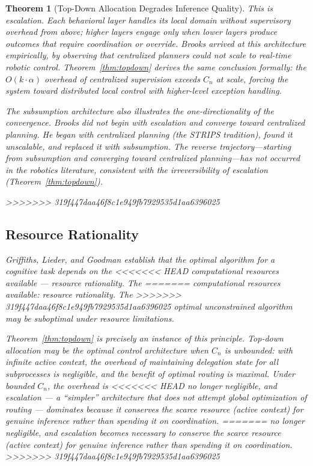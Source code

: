 \documentclass[11pt]{article}
\newtheorem{theorem}{Theorem}
\theoremstyle{definition}
\begin{document}
\begin{theorem}[Top-Down Allocation Degrades Inference Quality]
This is escalation. Each behavioral layer handles its local domain
without supervisory overhead from above; higher layers engage only when
lower layers produce outcomes that require coordination or override.
Brooks arrived at this architecture empirically, by observing that
centralized planners could not scale to real-time robotic control.
Theorem~\ref{thm:topdown} derives the same conclusion formally: the
$O(k \cdot \alpha)$ overhead of centralized supervision exceeds $C_n$
at scale, forcing the system toward distributed local control with
higher-level exception handling.

The subsumption architecture also illustrates the one-directionality
of the convergence. Brooks did not begin with escalation and converge
toward centralized planning. He began with centralized planning
(the STRIPS tradition), found it unscalable, and replaced it with
subsumption. The reverse trajectory---starting from subsumption and
converging toward centralized planning---has not occurred in the
robotics literature, consistent with the irreversibility of escalation
(Theorem~\ref{thm:topdown}).

>>>>>>> 319f447daa46f8c1e949fb7929535d1aa6396025
\subsection{Resource Rationality}

Griffiths, Lieder, and Goodman \cite{GriffithsEtAl2015} establish
that the optimal algorithm for a cognitive task depends on the
<<<<<<< HEAD
computational resources available --- resource rationality. The
=======
computational resources available: resource rationality. The
>>>>>>> 319f447daa46f8c1e949fb7929535d1aa6396025
optimal unconstrained algorithm may be suboptimal under resource
limitations.

Theorem~\ref{thm:topdown} is precisely an instance of this principle.
Top-down allocation may be the optimal control architecture when $C_n$
is unbounded: with infinite active context, the overhead of maintaining
delegation state for all subprocesses is negligible, and the benefit
of optimal routing is maximal. Under bounded $C_n$, the overhead is
<<<<<<< HEAD
no longer negligible, and escalation --- a ``simpler'' architecture
that does not attempt global optimization of routing --- dominates
because it conserves the scarce resource (active context) for genuine
inference rather than spending it on coordination.
=======
no longer negligible, and escalation becomes necessary to conserve the
scarce resource (active context) for genuine inference rather than
spending it on coordination.
>>>>>>> 319f447daa46f8c1e949fb7929535d1aa6396025


\end{theorem}
\end{document}
